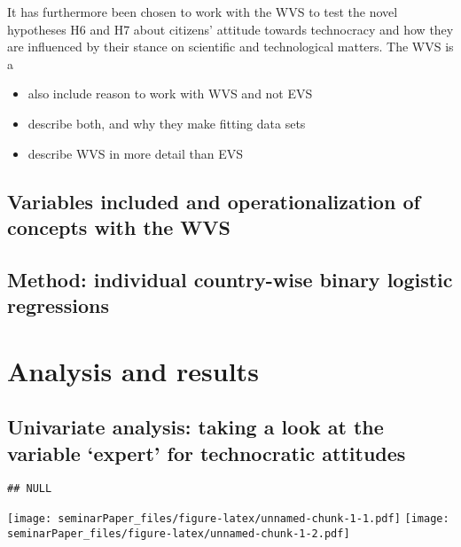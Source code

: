 \documentclass[
  12pt,
  english,
]{article}
\providecommand{\tightlist}{%
  \setlength{\itemsep}{0pt}\setlength{\parskip}{0pt}}
\begin{document}
It has furthermore been chosen to work with the WVS to test the novel
hypotheses H6 and H7 about citizens' attitude towards technocracy and
how they are influenced by their stance on scientific and technological
matters. The WVS is a

\begin{itemize}
\tightlist
\item
  also include reason to work with WVS and not EVS
\item
  describe both, and why they make fitting data sets
\item
  describe WVS in more detail than EVS
\end{itemize}

\hypertarget{variables-included-and-operationalization-of-concepts-with-the-wvs}{%
\subsection{Variables included and operationalization of concepts with
the
WVS}\label{variables-included-and-operationalization-of-concepts-with-the-wvs}}

\hypertarget{method-individual-country-wise-binary-logistic-regressions}{%
\subsection{Method: individual country-wise binary logistic
regressions}\label{method-individual-country-wise-binary-logistic-regressions}}

\hypertarget{analysis-and-results}{%
\section{Analysis and results}\label{analysis-and-results}}

\hypertarget{univariate-analysis-taking-a-look-at-the-variable-expert-for-technocratic-attitudes}{%
\subsection{Univariate analysis: taking a look at the variable `expert'
for technocratic
attitudes}\label{univariate-analysis-taking-a-look-at-the-variable-expert-for-technocratic-attitudes}}

\begin{verbatim}
## NULL
\end{verbatim}

\texttt{[image: seminarPaper\_files/figure-latex/unnamed-chunk-1-1.pdf]}
\texttt{[image: seminarPaper\_files/figure-latex/unnamed-chunk-1-2.pdf]}
\end{document}

